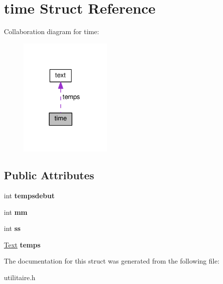 \hypertarget{structtime}{}\section{time Struct Reference}
\label{structtime}


Collaboration diagram for time\+:\nopagebreak
\begin{figure}[H]
\begin{center}
\leavevmode
\includegraphics[width=129pt]{structtime__coll__graph}
\end{center}
\end{figure}
\subsection*{Public Attributes}
\begin{DoxyCompactItemize}
\item 
int {\bfseries tempsdebut}\hypertarget{structtime_a631b29da38929a12fb4997cb6c77ca65}{}\label{structtime_a631b29da38929a12fb4997cb6c77ca65}

\item 
int {\bfseries mm}\hypertarget{structtime_ae3e68d8be9d3f14dec119d67b848fc47}{}\label{structtime_ae3e68d8be9d3f14dec119d67b848fc47}

\item 
int {\bfseries ss}\hypertarget{structtime_a9d94f0d593508ac616752cbe36601004}{}\label{structtime_a9d94f0d593508ac616752cbe36601004}

\item 
\hyperlink{structtext}{Text} {\bfseries temps}\hypertarget{structtime_a664308034ded61bae3412c574ad3305c}{}\label{structtime_a664308034ded61bae3412c574ad3305c}

\end{DoxyCompactItemize}


The documentation for this struct was generated from the following file\+:\begin{DoxyCompactItemize}
\item 
utilitaire.\+h\end{DoxyCompactItemize}
